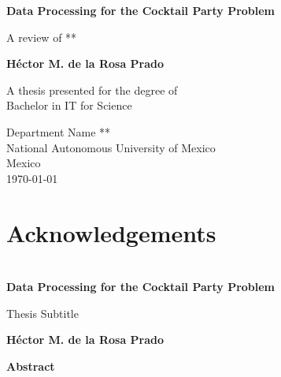 \documentclass{book}
\begin{document}
\newcommand{\titlename}{Data Processing for the Cocktail Party Problem}

\begin{titlepage}
    \begin{center}
        \vspace*{1cm}
 
        \Huge
        \textbf{\titlename}
 
        \vspace{0.5cm}
        \LARGE
        A review of **
 
        \vspace{1.5cm}
 
        \textbf{Héctor M. de la Rosa Prado}
 
        \vfill
 
        A thesis presented for the degree of\\
        Bachelor in IT for Science
 
        \vspace{0.8cm}
 
        
        \Large
        Department Name **\\
        National Autonomous University of Mexico\\
        Mexico\\
        \today\\
 
    \end{center}
\end{titlepage}
\tableofcontents
\newpage
\thispagestyle{plain}

\chapter*{Acknowledgements}
\chapter*{}
\begin{center}
    \Large
    \textbf{\titlename}
 
    \vspace{0.4cm}
    \large
    Thesis Subtitle
 
    \vspace{0.4cm}
    \textbf{Héctor M. de la Rosa Prado}
 
    \vspace{0.9cm}
    \textbf{Abstract}
\end{center}
\end{document}
